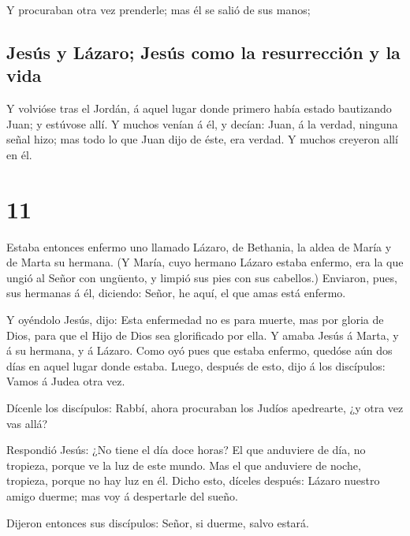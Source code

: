  Y procuraban otra vez prenderle; mas él se salió de sus
manos;

\hypertarget{jesuxfas-y-luxe1zaro-jesuxfas-como-la-resurrecciuxf3n-y-la-vida}{%
\subsection{Jesús y Lázaro; Jesús como la resurrección y la
vida}\label{jesuxfas-y-luxe1zaro-jesuxfas-como-la-resurrecciuxf3n-y-la-vida}}

 Y volvióse tras el Jordán, á aquel lugar donde primero
había estado bautizando Juan; y estúvose allí.  Y muchos
venían á él, y decían: Juan, á la verdad, ninguna señal hizo; mas todo
lo que Juan dijo de éste, era verdad.  Y muchos creyeron
allí en él.

\hypertarget{section-43-11}{%
\section{11}\label{section-43-11}}

 Estaba entonces enfermo uno llamado Lázaro, de Bethania,
la aldea de María y de Marta su hermana.  (Y María, cuyo
hermano Lázaro estaba enfermo, era la que ungió al Señor con ungüento, y
limpió sus pies con sus cabellos.)  Enviaron, pues, sus
hermanas á él, diciendo: Señor, he aquí, el que amas está enfermo.

 Y oyéndolo Jesús, dijo: Esta enfermedad no es para
muerte, mas por gloria de Dios, para que el Hijo de Dios sea glorificado
por ella.  Y amaba Jesús á Marta, y á su hermana, y á
Lázaro.  Como oyó pues que estaba enfermo, quedóse aún dos
días en aquel lugar donde estaba.  Luego, después de esto,
dijo á los discípulos: Vamos á Judea otra vez.

 Dícenle los discípulos: Rabbí, ahora procuraban los
Judíos apedrearte, ¿y otra vez vas allá?

 Respondió Jesús: ¿No tiene el día doce horas? El que
anduviere de día, no tropieza, porque ve la luz de este mundo.
 Mas el que anduviere de noche, tropieza, porque no hay
luz en él.  Dicho esto, díceles después: Lázaro nuestro
amigo duerme; mas voy á despertarle del sueño.

 Dijeron entonces sus discípulos: Señor, si duerme, salvo
estará.

